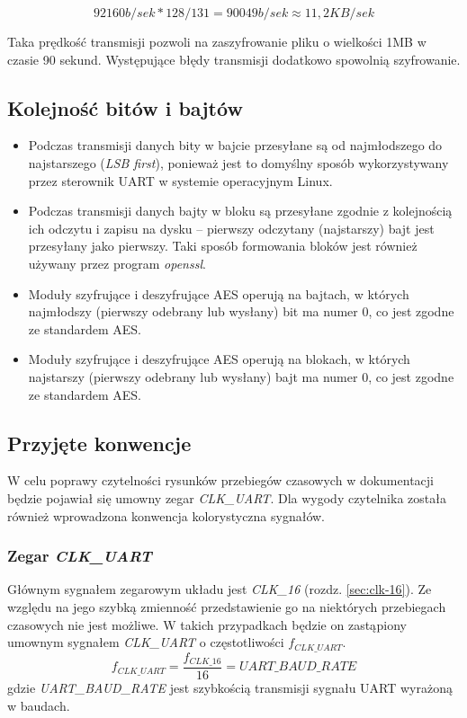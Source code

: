 \begin{equation*}
92160 b/sek * 128 / 131 = 90049 b/sek \approx 11,2 KB/sek 
\end{equation*}

Taka prędkość transmisji pozwoli na zaszyfrowanie pliku o wielkości 1MB w czasie 90 sekund. Występujące błędy transmisji dodatkowo spowolnią szyfrowanie.

\subsection{Kolejność bitów i bajtów}
\begin{itemize}
\item Podczas transmisji danych bity w bajcie przesyłane są od najmłodszego do najstarszego (\textit{LSB first}), ponieważ jest to domyślny sposób wykorzystywany przez sterownik UART w systemie operacyjnym Linux.
\item Podczas transmisji danych bajty w bloku są przesyłane zgodnie z kolejnością ich odczytu i zapisu na dysku -- pierwszy odczytany (najstarszy) bajt jest przesyłany jako pierwszy. Taki sposób formowania bloków jest również używany przez program \textit{openssl}.
\item Moduły szyfrujące i deszyfrujące AES operują na bajtach, w których najmłodszy (pierwszy odebrany lub wysłany) bit ma numer 0, co jest zgodne ze standardem AES.
\item Moduły szyfrujące i deszyfrujące AES operują na blokach, w których najstarszy (pierwszy odebrany lub wysłany) bajt ma numer 0, co jest zgodne ze standardem AES.
\end{itemize}

\subsection{Przyjęte konwencje}

W celu poprawy czytelności rysunków przebiegów czasowych w dokumentacji będzie pojawiał się umowny zegar \textit{CLK\_UART}. Dla wygody czytelnika została również wprowadzona konwencja kolorystyczna sygnałów.

\subsubsection{Zegar \textit{CLK\_UART}}
Głównym sygnałem zegarowym układu jest \textit{CLK\_16} (rozdz. \ref{sec:clk-16}). Ze względu na jego szybką zmienność przedstawienie go na niektórych przebiegach czasowych nie jest możliwe. W takich przypadkach będzie on zastąpiony umownym sygnałem \textit{CLK\_UART} o częstotliwości $f_{CLK\_UART}$.
\begin{equation*}
f_{CLK\_UART} = \frac{f_{CLK\_16}}{16} = UART\_BAUD\_RATE
\label{eq:clk-uart-freq}
\end{equation*}
gdzie \textit{UART\_BAUD\_RATE} jest szybkością transmisji sygnału UART wyrażoną w baudach. 


